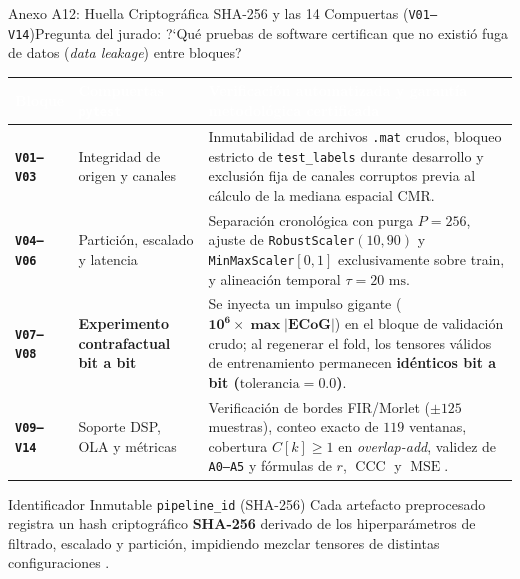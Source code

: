 \begin{frame}{Anexo A12: Huella Criptogr\'afica SHA-256 y las 14 Compuertas (\texttt{V01--V14})}{Pregunta del jurado: ?`Qu\'e pruebas de software certifican que no existi\'o fuga de datos (\textit{data leakage}) entre bloques?}
  \label{anexo:auditoria_v01_v14}
  \centering
  \scriptsize
  \renewcommand{\arraystretch}{1.18}
  \begin{tabularx}{\textwidth}{>{\bfseries\color{ipnDark}}l l >{\raggedright\arraybackslash}X}
    \toprule
    \rowcolor{ipnDark}
    \textcolor{white}{Bloque} & \textcolor{white}{Compuertas \texttt{pytest}} & \textcolor{white}{Verificaci\'on automatizada y garant\'ia metodol\'ogica certificada} \\
    \midrule
    \texttt{V01--V03} & Integridad de origen y canales & Inmutabilidad de archivos \texttt{.mat} crudos, bloqueo estricto de \texttt{test\_labels} durante desarrollo y exclusi\'on fija de canales corruptos previa al c\'alculo de la mediana espacial CMR. \\
    \rowcolor{rowLight}
    \texttt{V04--V06} & Partici\'on, escalado y latencia & Separaci\'on cronol\'ogica con purga $P=256$, ajuste de \texttt{RobustScaler}$(10,90)$ y \texttt{MinMaxScaler}$[0,1]$ exclusivamente sobre train, y alineaci\'on temporal $\tau=20\text{ ms}$. \\
    \rowcolor{rowHighlight}
    \texttt{V07--V08} & \textbf{Experimento contrafactual bit a bit} & Se inyecta un impulso gigante ($\mathbf{10^6 \times \max|\text{ECoG}|}$) en el bloque de validaci\'on crudo; al regenerar el fold, los tensores v\'alidos de entrenamiento permanecen \textbf{id\'enticos bit a bit ($\text{tolerancia} = 0.0$)}. \\
    \texttt{V09--V14} & Soporte DSP, OLA y m\'etricas & Verificaci\'on de bordes FIR/Morlet ($\pm 125$ muestras), conteo exacto de $119$ ventanas, cobertura $C[k]\ge 1$ en \textit{overlap-add}, validez de \texttt{A0--A5} y f\'ormulas de $r$, $\operatorname{CCC}$ y $\operatorname{MSE}$. \\
    \bottomrule
  \end{tabularx}

  \vspace{2mm}
  \begin{block}{Identificador Inmutable \texttt{pipeline\_id} (SHA-256)}
    \scriptsize
    Cada artefacto preprocesado registra un hash criptogr\'afico \textbf{SHA-256} derivado de los hiperpar\'ametros de filtrado, escalado y partici\'on, impidiendo mezclar tensores de distintas configuraciones \cite{rodas_valencia_tpe_ecog}. \hfill\hyperlink{anexo:indice_extra}{}
  \end{block}
\end{frame}

